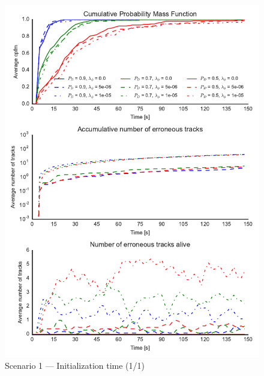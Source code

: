 
\begin{figure}
\centering
\includegraphics{Figures/plots/Scenario1_Init-Time(1-1).pdf}
\caption{Scenario 1 --- Initialization time (1/1)}\label{fig:init1_time_1-1}
\end{figure}

